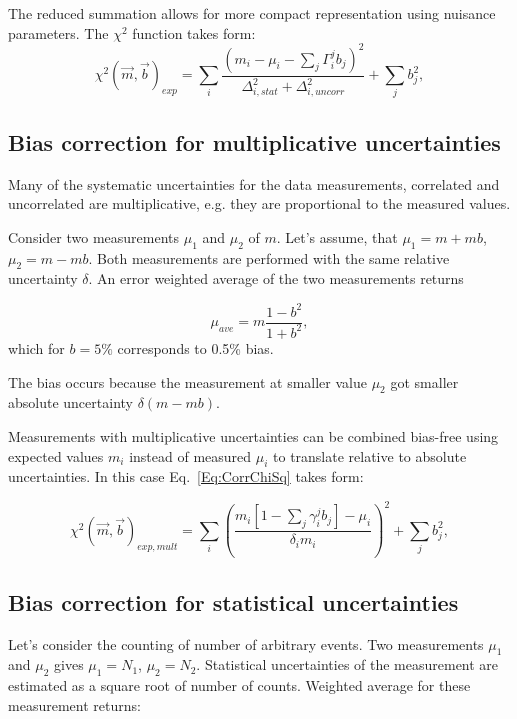 The reduced summation allows for more compact representation using nuisance parameters. The 
$\chi^2$ function takes form:
\begin{equation}
  \chi^2(\vec{m},\vec{b})_{exp} = \sum_{i} \frac{(m_i-\mu_i-\sum_j \Gamma_i^j b_j)^2}{\Delta_{i, stat}^2 + \Delta_{i, uncorr}^2} + \sum_{j}
  b_j^2,
  \label{Eq:CorrChiSq2}
\end{equation}


\subsection{Bias correction for multiplicative uncertainties}
\label{Sec:MultBias}
Many of the systematic uncertainties for the data measurements, correlated and uncorrelated are multiplicative, e.g. they are proportional to the measured values.

Consider two measurements $\mu_1$ and $\mu_2$ of $m$. Let's assume, that $\mu_1 = m + mb$, $\mu_2 = m-mb$. Both measurements are performed with the same relative uncertainty $\delta$. An error weighted average of the two measurements returns

\begin{equation}
  \mu_{ave} = m \frac{1-b^2}{1+b^2},
  \label{Eq:ErrorAverage}
\end{equation}
which for $b=5\%$ corresponds to 0.5\% bias.

The bias occurs because the measurement at smaller value $\mu_2$ got smaller absolute uncertainty $\delta(m-mb)$.

Measurements with multiplicative uncertainties can be combined bias-free using
expected values $m_i$ instead of measured $\mu_i$ to translate relative to absolute uncertainties. In this case Eq.~\ref{Eq:CorrChiSq} takes form:

\begin{equation}
  \chi^2(\vec{m},\vec{b})_{exp,mult} = \sum_{i} \left(\frac{m_i[1-\sum_j \gamma_i^jb_j]  - \mu_i}{\delta_{i}m_i}\right)^2 + \sum_{j}  b_j^2,
  \label{Eq:StatCorrChiSq2}
\end{equation}

\subsection{Bias correction for statistical uncertainties}
\label{Sec:StatBias}
Let's consider the counting of number of arbitrary events. Two measurements $\mu_1$ and $\mu_2$ gives $\mu_1 = N_1$, $\mu_2 = N_2$. Statistical uncertainties of the measurement are estimated as a square root of number of counts. Weighted average for these measurement returns:

